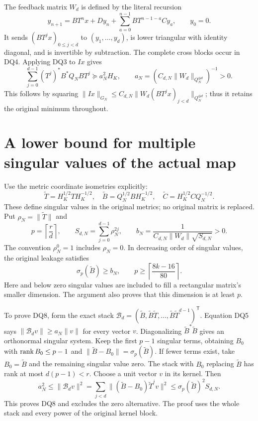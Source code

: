 \documentclass[11pt]{article}
\begin{document}
The feedback matrix $W_d$ is defined by the literal recursion
\[
 y_{n+1}=BT^nx+Dy_n+\sum_{a=0}^{n-1}BT^{n-1-a}Cy_a,
 \qquad y_0=0.\tag{DQ4}
\]
It sends $(BT^jx)_{0\le j<d}$ to $(y_1,\ldots,y_d)$, is lower
triangular with identity diagonal, and is invertible by subtraction.
The complete cross blocks occur in DQ4. Applying DQ3 to $Ix$ gives
\[
 \sum_{j=0}^{d-1}(T^j)^*B^*Q_NBT^j
 \succeq a_N^2H_K,
 \qquad a_N=(C_{d,N}\|W_d\|_{Q_N^{\oplus d}})^{-1}>0.
 \tag{DQ5}
\]
This follows by squaring
$\|Ix\|_{G_N}\le C_{d,N}\|W_d(BT^jx)_{j<d}\|_{Q_N^{\oplus d}}$;
thus it retains the original minimum throughout.

\section{A lower bound for multiple singular values of the actual map}
Use the metric coordinate isometries explicitly:
\[
 \widetilde T=H_K^{1/2}TH_K^{-1/2},\quad
 \widetilde B=Q_N^{1/2}BH_K^{-1/2},\quad
 \widetilde C=H_K^{1/2}CQ_N^{-1/2}.
 \tag{DQ6}
\]
These define singular values in the original metrics; no original matrix
is replaced. Put $\rho_N=\|\widetilde T\|$ and
\[
 p=\left\lceil\frac rd\right\rceil,\qquad
 S_{d,N}=\sum_{j=0}^{d-1}\rho_N^{2j},\qquad
 b_N=\frac{1}{C_{d,N}\|W_d\|\sqrt{S_{d,N}}}>0.
 \tag{DQ7}
\]
The convention $\rho_N^0=1$ includes $\rho_N=0$. In decreasing
order of singular values, the original leakage satisfies
\[
 \boxed{\sigma_p(\widetilde B)\ge b_N,
 \qquad p\ge\left\lceil\frac{8k-16}{80}\right\rceil.}
 \tag{DQ8}
\]
Here and below zero singular values are included to fill a rectangular
matrix's smaller dimension. The argument also proves that this dimension
is at least $p$.

To prove DQ8, form the exact stack
$\mathcal B_d=(\widetilde B,\widetilde B\widetilde T,\ldots,
\widetilde B\widetilde T^{d-1})^{\mathsf T}$. Equation DQ5 says
$\|\mathcal B_dv\|\ge a_N\|v\|$ for every vector $v$.
Diagonalizing $\widetilde B^*\widetilde B$ gives an orthonormal
singular system. Keep the first $p-1$ singular terms, obtaining $B_0$
with $\operatorname{rank} B_0\le p-1$ and
$\|\widetilde B-B_0\|=\sigma_p(\widetilde B)$.
If fewer terms exist, take $B_0=\widetilde B$ and the remaining
singular value zero. The stack with $B_0$ replacing $\widetilde B$
has rank at most $d(p-1)<r$. Choose a unit vector $v$ in its kernel.
Then
\[
 a_N^2\le\|\mathcal B_dv\|^2
 =\sum_{j<d}\|(\widetilde B-B_0)\widetilde T^jv\|^2
 \le\sigma_p(\widetilde B)^2 S_{d,N}.
 \tag{DQ9}
\]
This proves DQ8 and excludes the zero alternative. The proof uses the
whole stack and every power of the original kernel block.
\end{document}
